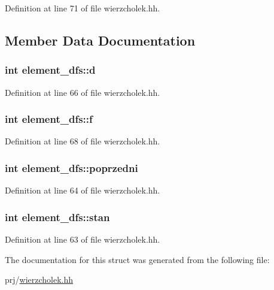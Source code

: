\-Definition at line 71 of file wierzcholek.\-hh.



\subsection{\-Member \-Data \-Documentation}
\hypertarget{structelement__dfs_ae2d3c82805dc8b9b24a7dc1511c283dd}{
\subsubsection[{d}]{\setlength{\rightskip}{0pt plus 5cm}int {\bf element\-\_\-dfs\-::d}}}\label{structelement__dfs_ae2d3c82805dc8b9b24a7dc1511c283dd}


\-Definition at line 66 of file wierzcholek.\-hh.

\hypertarget{structelement__dfs_a9a75ad927680701485941a4e42b36290}{
\subsubsection[{f}]{\setlength{\rightskip}{0pt plus 5cm}int {\bf element\-\_\-dfs\-::f}}}\label{structelement__dfs_a9a75ad927680701485941a4e42b36290}


\-Definition at line 68 of file wierzcholek.\-hh.

\hypertarget{structelement__dfs_af3205a446fe8c834532d3b5de81deefa}{
\subsubsection[{poprzedni}]{\setlength{\rightskip}{0pt plus 5cm}int {\bf element\-\_\-dfs\-::poprzedni}}}\label{structelement__dfs_af3205a446fe8c834532d3b5de81deefa}


\-Definition at line 64 of file wierzcholek.\-hh.

\hypertarget{structelement__dfs_a48b8257c62eb0f4c52e10bf2c06fffda}{
\subsubsection[{stan}]{\setlength{\rightskip}{0pt plus 5cm}int {\bf element\-\_\-dfs\-::stan}}}\label{structelement__dfs_a48b8257c62eb0f4c52e10bf2c06fffda}


\-Definition at line 63 of file wierzcholek.\-hh.



\-The documentation for this struct was generated from the following file\-:\begin{DoxyCompactItemize}
\item 
prj/\hyperlink{wierzcholek_8hh}{wierzcholek.\-hh}\end{DoxyCompactItemize}
